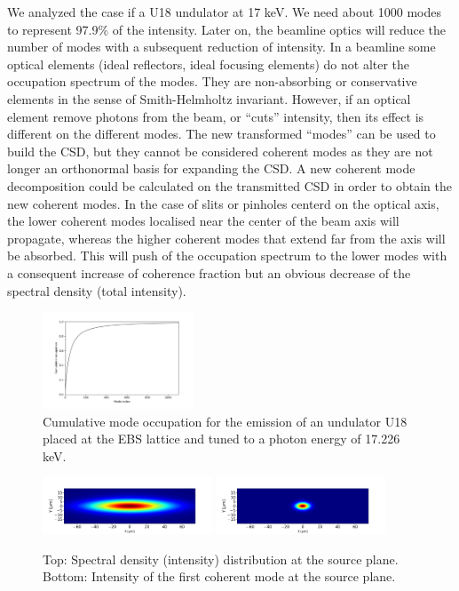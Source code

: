 \documentclass[a4paper,10pt]{article}
\begin{document}
We analyzed the case if a U18 undulator at 17 keV. We need about 1000 modes to represent 97.9\% of the intensity. Later on, the beamline optics will reduce the number of modes  with a subsequent reduction of intensity. In a beamline some optical elements (ideal reflectors, ideal focusing elements) do not alter the occupation spectrum of the modes. They are non-absorbing or conservative elements in the sense of Smith-Helmholtz invariant. However, if an optical element remove photons from the beam, or ``cuts'' intensity, then its effect is different on the different modes. The new transformed ``modes'' can be used to build the CSD, but they cannot be considered coherent modes as they are not longer an orthonormal basis for expanding the CSD. A new coherent mode decomposition could be calculated on the transmitted CSD in order to obtain the new coherent modes. In the case of slits or pinholes centerd on the optical axis, the lower coherent modes localised near the center of the beam axis will propagate, whereas the higher coherent modes that extend far from the axis will be absorbed. This will push of the occupation spectrum to the lower modes with a consequent increase of coherence fraction but an obvious decrease of the spectral density (total intensity).     


\begin{figure}\label{cumulative_mode_occupation}
\caption{Cumulative mode occupation for the emission of an undulator U18 placed at the EBS lattice and tuned to a photon energy of 17.226 keV.}
\includegraphics[width=0.4\textwidth]{Figures/vx_cumulated.png}
\end{figure}

\begin{figure}\label{spectral_density}%
\caption{Top: Spectral density (intensity) distribution at the source plane. Bottom: Intensity of the first coherent mode at the source plane.}
\includegraphics[width=0.45\textwidth]{Figures/spectral_density_upto1099.png}
\includegraphics[width=0.45\textwidth]{Figures/spectral_density_upto0.png}
\end{figure}
\end{document}
